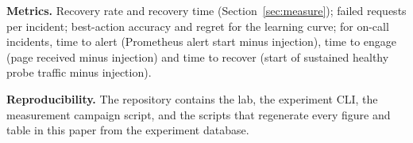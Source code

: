 \textbf{Metrics.} Recovery rate and recovery time (Section~\ref{sec:measure}); failed requests per
incident; best-action accuracy and regret for the learning curve; for on-call incidents, time to
alert (Prometheus alert start minus injection), time to engage (page received minus injection) and
time to recover (start of sustained healthy probe traffic minus injection).

\textbf{Reproducibility.} The repository contains the lab, the experiment CLI, the measurement
campaign script, and the scripts that regenerate every figure and table in this paper from the
experiment database.
